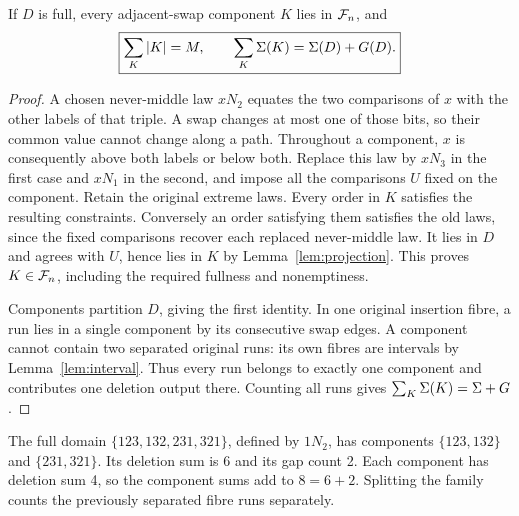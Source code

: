 \begin{theorem}\label{thm:components}
If \(D\) is full, every adjacent-swap component \(K\) lies in \(\mathcal F_n\),
and
\[
 \boxed{\sum_K|K|=M,\qquad\sum_K\Sigma(K)=\Sigma(D)+G(D).}
\]
\end{theorem}
\begin{proof}
A chosen never-middle law \(xN_2\) equates the two comparisons of
\(x\) with the other labels of that triple. A swap changes at most
one of those bits, so their common value cannot change along a path.
Throughout a component, \(x\) is consequently above both labels or
below both. Replace this law by \(xN_3\) in the first case and \(xN_1\)
in the second, and impose all the comparisons \(U\) fixed on the
component. Retain the original extreme laws. Every order in \(K\)
satisfies the resulting constraints. Conversely an order satisfying
them satisfies the old laws, since the fixed comparisons recover
each replaced never-middle law. It lies in \(D\) and agrees with
\(U\), hence lies in \(K\) by Lemma~\ref{lem:projection}. This proves
\(K\in\mathcal F_n\), including the required fullness and nonemptiness.

Components partition \(D\), giving the first identity. In one original
insertion fibre, a run lies in a single component by its consecutive
swap edges. A component cannot contain two separated original runs:
its own fibres are intervals by Lemma~\ref{lem:interval}. Thus every
run belongs to exactly one component and contributes one deletion
output there. Counting all runs gives \(\sum_K\Sigma(K)=\Sigma+G\).
\end{proof}

\begin{example}
The full domain \(\{123,132,231,321\}\), defined by \(1N_2\), has
components \(\{123,132\}\) and \(\{231,321\}\). Its deletion sum is
6 and its gap count 2. Each component has deletion sum 4, so the
component sums add to \(8=6+2\). Splitting the family counts the
previously separated fibre runs separately.
\end{example}

